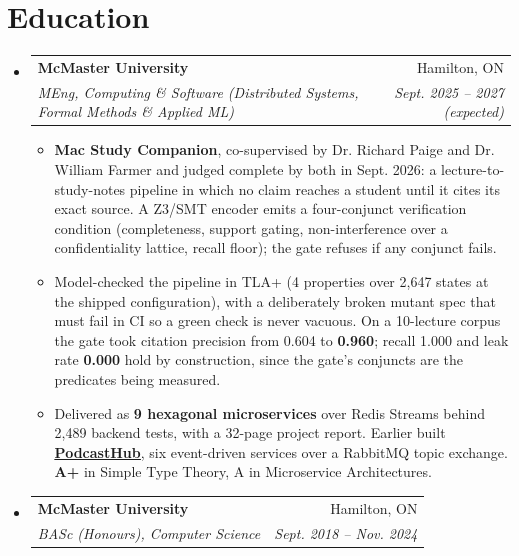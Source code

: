 \documentclass[letterpaper,11pt]{article}
\makeatletter
\newcommand{\resumeItem}[1]{
  \item\small{
    {#1\vspace{-2pt}}
  }
}
\newcommand{\resumeSubheading}[4]{
  \vspace{-2pt}\item
    \begin{tabular*}{0.97\textwidth}[t]{l@{\extracolsep{\fill}}r}
      \textbf{#1} & #2 \\
      \textit{\small#3} & \textit{\small #4} \\
    \end{tabular*}\vspace{-7pt}
}
\newcommand{\resumeSubHeadingListStart}{\begin{itemize}[leftmargin=0.15in, label={}]}
\newcommand{\resumeSubHeadingListEnd}{\end{itemize}}
\newcommand{\resumeItemListStart}{\begin{itemize}}
\newcommand{\resumeItemListEnd}{\end{itemize}\vspace{-5pt}}
\makeatother
\begin{document}
\section{Education}
  \resumeSubHeadingListStart
    \resumeSubheading
      {McMaster University}{Hamilton, ON}
      {MEng, Computing \& Software (Distributed Systems, Formal Methods \& Applied ML)}{Sept. 2025 -- 2027 (expected)}
      \resumeItemListStart
        \resumeItem{\textbf{Mac Study Companion}, co-supervised by Dr. Richard Paige and Dr. William Farmer and judged complete by both in Sept. 2026: a lecture-to-study-notes pipeline in which no claim reaches a student until it cites its exact source. A Z3/SMT encoder emits a four-conjunct verification condition (completeness, support gating, non-interference over a confidentiality lattice, recall floor); the gate refuses if any conjunct fails.}
        \resumeItem{Model-checked the pipeline in TLA+ (4 properties over 2,647 states at the shipped configuration), with a deliberately broken mutant spec that must fail in CI so a green check is never vacuous. On a 10-lecture corpus the gate took citation precision from 0.604 to \textbf{0.960}; recall 1.000 and leak rate \textbf{0.000} hold by construction, since the gate's conjuncts are the predicates being measured.}
        \resumeItem{Delivered as \textbf{9 hexagonal microservices} over Redis Streams behind 2,489 backend tests, with a 32-page project report. Earlier built \href{https://www.suleyman.io/architecture}{\underline{\textbf{PodcastHub}}}, six event-driven services over a RabbitMQ topic exchange. \textbf{A+} in Simple Type Theory, A in Microservice Architectures.}
      \resumeItemListEnd
    \resumeSubheading
      {McMaster University}{Hamilton, ON}
      {BASc (Honours), Computer Science}{Sept. 2018 -- Nov. 2024}
  \resumeSubHeadingListEnd

\end{document}
